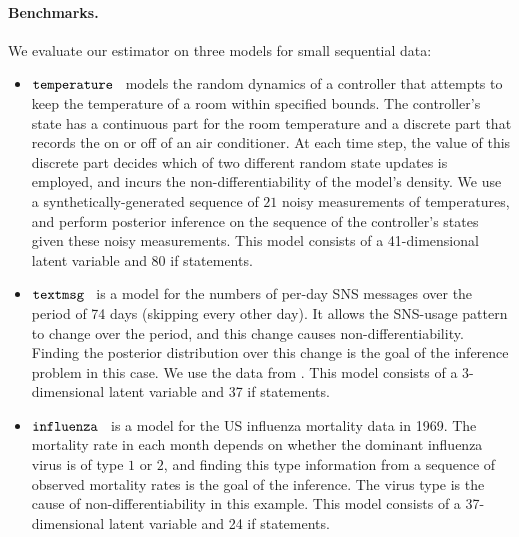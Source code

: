 \paragraph{Benchmarks.}
We evaluate our estimator on three models for small sequential data:
\begin{itemize}
\item $\mathtt{temperature}$~\cite{SoudjaniQUEST17} models the random dynamics of a controller that attempts to keep the temperature of a room within specified bounds. The controller's state has a continuous part for the room temperature and a discrete part that records the on or off of an air conditioner. At each time step, the value of this discrete part decides which of two different random state updates is employed, and incurs the non-differentiability of the model's density. We use a synthetically-generated sequence of $21$ noisy measurements of temperatures, and perform posterior inference on the sequence of the controller's states given these noisy measurements.
  This model consists of a 41-dimensional latent variable and 80 if statements.
\item $\mathtt{textmsg}$~\cite{PilonBook} is a model for the numbers of per-day SNS messages over the period of 74 days (skipping every other day). It allows the SNS-usage pattern to change over the period, and this change causes non-differentiability. Finding the posterior distribution over this change is the goal of the inference problem in this case. We use the data from \cite{PilonBook}.
  This model consists of a 3-dimensional latent variable and 37 if statements.
\item $\mathtt{influenza}$~\cite{ShumwayBook} is a model for the US influenza mortality data in 1969. The mortality rate in each month depends on whether the dominant influenza virus is of type $1$ or $2$, and finding this type information from a sequence of observed mortality rates is the goal of the inference. The virus type is the cause of non-differentiability in this example.
  This model consists of a 37-dimensional latent variable and 24 if statements.
\end{itemize}


